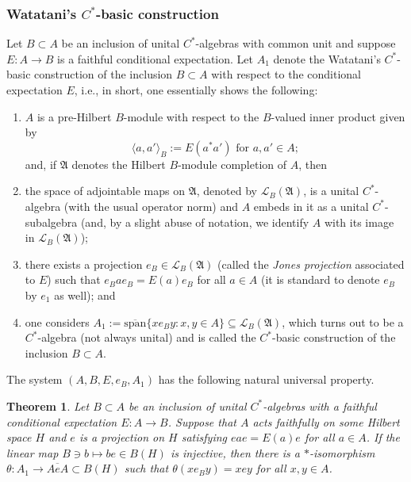 \documentclass[a4]{amsart}
\newtheorem{theorem}{\bf Theorem}[section]
\numberwithin{equation}{section}
\newcommand{\la}{\langle}
\newcommand{\ra}{\rangle}
\newcommand{\mA}{\mathfrak{A}}
\begin{document}
\subsubsection{Watatani's $C^*$-basic construction} 
Let $B\subset A$ be an inclusion of unital $C^*$-algebras with common
unit and suppose $E: A \to B$ is a faithful conditional expectation.
Let $A_1$ denote the Watatani's $C^*$-basic construction of the
inclusion $B \subset A$ with respect to the conditional expectation
$E$, i.e., in short, one essentially shows the following:
\begin{enumerate}
  \item $A$ is a pre-Hilbert $B$-module with respect to the $B$-valued inner product given by
\[
\la a, a'\ra_B:=E(a^*a')\text{ for } a, a'\in A;
\]
and, if  $\mathfrak{A}$ denotes the Hilbert $B$-module completion of $A$, then
\item the space of adjointable maps on $\mA$, denoted by
  $\mathcal{L}_B(\mA)$, is a unital $C^*$-algebra (with the usual
  operator norm) and $A$ embeds in it as a unital $C^*$-subalgebra
  (and, by a slight abuse of notation, we identify $A$ with its image
  in $\mathcal{L}_B(\mA)$);
\item there exists a projection $e_B\in \mathcal{L}_B(\mA)$ (called the
  {\em Jones projection} associated to $E$) such that $e_Bae_B=
  E(a)e_B$ for all $a \in A$ (it is standard to denote $e_B$ by $e_1$
  as well);  and 
\item one considers $A_1 := \overline{\mathrm{span}}\{xe_By: x,y \in
  A\} \subseteq \mathcal{L}_B(\mA)$, which turns out to be a 
  $C^*$-algebra (not always unital)  and is called the $C^*$-basic construction of the
  inclusion $B \subset A$.
 \end{enumerate}

The system $(A, B,E, e_B, A_1)$ has the following natural
 universal property.

 \begin{theorem}\cite[Proposition 2.2.11]{Wat}\label{universal-property}
Let $B \subset A$ be an inclusion of unital $C^*$-algebras with a
faithful conditional expectation $E: A \to B$. Suppose that $A$ acts
   faithfully on some Hilbert space $H$ and $e$ is a projection on $
   H$ satisfying $eae=E(a)e$ for all $a \in A$. If the linear map $B \ni b
   \mapsto be \in B(H)$ is injective, then there is a $*$-isomorphism
   $\theta: A_1 \to \overline{AeA} \subset B(H)$ such that
   $\theta(xe_By) = x ey$ for all $x, y \in A$.
    \end{theorem}
\end{document}
